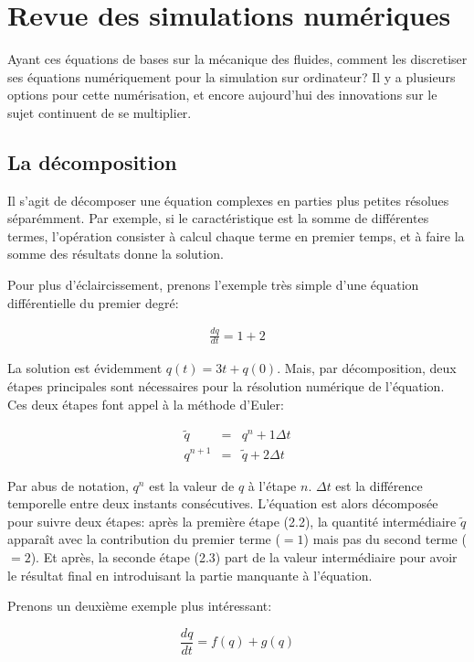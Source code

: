 \documentclass[11pt]{report}
\begin{document}
\chapter{Revue des simulations numériques}

Ayant ces équations de bases sur la mécanique des fluides, comment les discretiser ses équations numériquement pour la simulation sur ordinateur? Il y a plusieurs options pour cette numérisation, et encore aujourd'hui des innovations sur le sujet continuent de se multiplier.

\section{La décomposition}

Il s'agit de décomposer une équation complexes en parties plus petites résolues séparémment. Par exemple, si le caractéristique est la somme de différentes termes, l'opération consister à calcul chaque terme en premier temps, et à faire la somme des résultats donne la solution.

Pour plus d'éclaircissement, prenons l'exemple très simple d'une équation différentielle du premier degré:

\begin{eqnarray}
\frac{dq}{dt} = 1 + 2
\end{eqnarray}

La solution est évidemment $ q(t) = 3t + q(0) $. Mais, par décomposition, deux étapes principales sont nécessaires pour la résolution numérique de l'équation. Ces deux étapes font appel à la méthode d'Euler:

\begin{eqnarray}
\tilde{q} & = & q^n + 1\Delta t\\
q^{n+1} & = & \tilde{q} + 2 \Delta t
\end{eqnarray}

Par abus de notation, $ q^n $ est la valeur de $ q $ à l'étape $ n $. $ \Delta t $ est   la différence temporelle entre deux instants consécutives. L'équation est alors décomposée pour suivre deux étapes: après la première étape (2.2), la quantité intermédiaire $ \tilde{q} $ apparaît avec la contribution du premier terme ($ = 1$) mais pas du second terme ($ = 2 $). Et après, la seconde étape (2.3) part de la valeur intermédiaire pour avoir le résultat final en introduisant la partie manquante à l'équation.

Prenons un deuxième exemple plus intéressant:

\begin{equation}
\frac{dq}{dt} = f(q) + g(q)
\end{equation}
\end{document}
